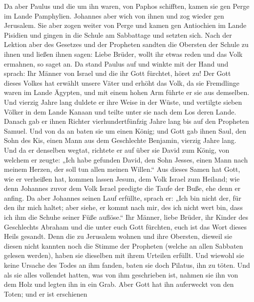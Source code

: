  Da aber Paulus und die um ihn waren, von Paphos
schifften, kamen sie gen Perge im Lande Pamphylien. Johannes aber wich
von ihnen und zog wieder gen Jerusalem.  Sie aber zogen
weiter von Perge und kamen gen Antiochien im Lande Pisidien und gingen
in die Schule am Sabbattage und setzten sich.  Nach der
Lektion aber des Gesetzes und der Propheten sandten die Obersten der
Schule zu ihnen und ließen ihnen sagen: Liebe Brüder, wollt ihr etwas
reden und das Volk ermahnen, so saget an.  Da stand
Paulus auf und winkte mit der Hand und sprach: Ihr Männer von Israel und
die ihr Gott fürchtet, höret zu!  Der Gott dieses Volkes
hat erwählt unsere Väter und erhöht das Volk, da sie Fremdlinge waren im
Lande Ägypten, und mit einem hohen Arm führte er sie aus demselben.
 Und vierzig Jahre lang duldete er ihre Weise in der
Wüste,  und vertilgte sieben Völker in dem Lande Kanaan
und teilte unter sie nach dem Los deren Lande.  Danach
gab er ihnen Richter vierhundertfünfzig Jahre lang bis auf den Propheten
Samuel.  Und von da an baten sie um einen König; und Gott
gab ihnen Saul, den Sohn des Kis, einen Mann aus dem Geschlechte
Benjamin, vierzig Jahre lang.  Und da er denselben
wegtat, richtete er auf über sie David zum König, von welchem er zeugte:
„Ich habe gefunden David, den Sohn Jesses, einen Mann nach meinem
Herzen, der soll tun allen meinen Willen.``  Aus dieses
Samen hat Gott, wie er verheißen hat, kommen lassen Jesum, dem Volk
Israel zum Heiland;  wie denn Johannes zuvor dem Volk
Israel predigte die Taufe der Buße, ehe denn er anfing. 
Da aber Johannes seinen Lauf erfüllte, sprach er: „Ich bin nicht der,
für den ihr mich haltet; aber siehe, er kommt nach mir, des ich nicht
wert bin, dass ich ihm die Schuhe seiner Füße auflöse.`` 
Ihr Männer, liebe Brüder, ihr Kinder des Geschlechts Abraham und die
unter euch Gott fürchten, euch ist das Wort dieses Heils gesandt.
 Denn die zu Jerusalem wohnen und ihre Obersten, dieweil
sie diesen nicht kannten noch die Stimme der Propheten (welche an allen
Sabbaten gelesen werden), haben sie dieselben mit ihrem Urteilen
erfüllt.  Und wiewohl sie keine Ursache des Todes an ihm
fanden, baten sie doch Pilatus, ihn zu töten.  Und als
sie alles vollendet hatten, was von ihm geschrieben ist, nahmen sie ihn
von dem Holz und legten ihn in ein Grab.  Aber Gott hat
ihn auferweckt von den Toten;  und er ist erschienen
